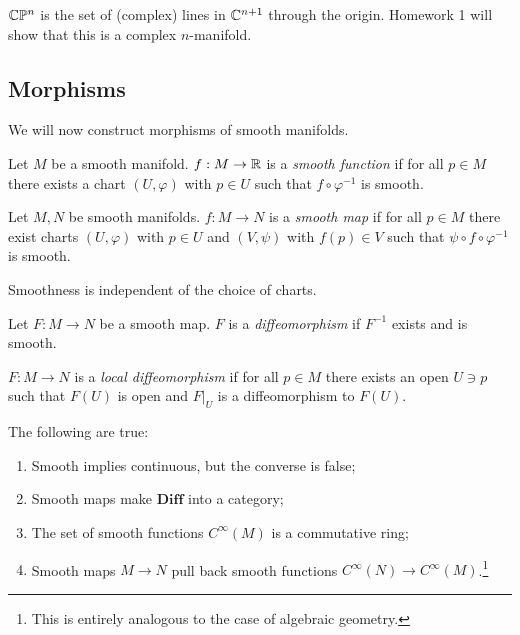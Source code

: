 \documentclass[twoside, 10pt]{article}
\begin{document}
    \begin{exm} $\mathbb{C}\mathbb{P}^n$ is the set of (complex) lines in $\mathbb{C}^{n+1}$ through
    the origin. Homework 1 will show that this is a complex $n$-manifold.
\end{exm}

    \subsection{Morphisms}%
    
    

    We will now construct morphisms of smooth manifolds.

    \begin{defn} Let $M$ be a smooth manifold. $f: M \to \mathbb{R}$ is a
    \textit{smooth function} if for all $p \in M$ there exists a chart $(U,
\varphi)$ with $p \in U$ such that $f \circ \varphi^{-1}$ is smooth.
\end{defn}

    \begin{defn} Let $M,N$ be smooth manifolds. $f:M \to N$ is a \textit{smooth
        map} if for all $p \in M$ there exist charts $(U, \varphi)$ with $p \in
        U$ and $(V, \psi)$ with $f(p) \in V$ such that $\psi \circ f \circ
        \varphi^{-1}$ is smooth.  \end{defn}

    \begin{rmk} Smoothness is independent of the choice of charts.  \end{rmk}

    \begin{defn} Let $F: M \to N$ be a smooth map. $F$ is a \textit{
    diffeomorphism  }if $F^{-1}$ exists and is smooth.  \end{defn}

    \begin{defn} $F: M \to N$ is a \textit{local diffeomorphism} if for all $p
    \in M$ there exists an open $U \ni p$ such that $F(U)$ is open and $F|_U$
is a diffeomorphism to $F(U)$.  \end{defn}
    
    \begin{prop} The following are true: \begin{enumerate} \item Smooth implies
        continuous, but the converse is false; \item Smooth maps make
        $\mathbf{Diff}$ into a category; \item The set of smooth functions
        $C^{\infty}(M)$ is a commutative ring; \item Smooth maps $M \to N$ pull
back smooth functions $C^{\infty}(N) \to C^{\infty}(M)$.\footnote{This is
entirely analogous to the case of algebraic geometry.} \end{enumerate}
\end{prop}
\end{document}
